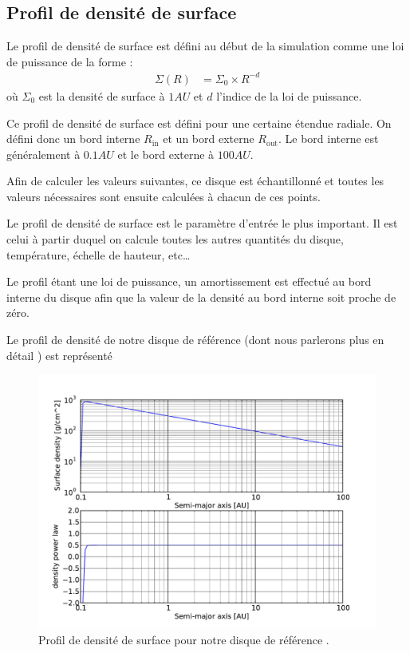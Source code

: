 \subsection{Profil de densité de surface}
Le profil de densité de surface est défini au début de la simulation comme une loi de puissance de la forme :
\begin{align}
\Sigma(R) &= \Sigma_0 \times R^{-d}
\end{align}
où $\Sigma_0$ est la densité de surface à $1\unit{AU}$ et $d$ l'indice de la loi de puissance. 

Ce profil de densité de surface est défini pour une certaine étendue radiale. On défini donc un bord interne $R_\text{in}$ et un bord externe $R_\text{out}$. Le bord interne est généralement à $0.1\unit{AU}$ et le bord externe à $100\unit{AU}$. 

Afin de calculer les valeurs suivantes, ce disque est échantillonné et toutes les valeurs nécessaires sont ensuite calculées à chacun de ces points. 

\bigskip

Le profil de densité de surface est le paramètre d'entrée le plus important. Il est celui à partir duquel on calcule toutes les autres quantités du disque, température, échelle de hauteur, etc\dots

Le profil étant une loi de puissance, un amortissement est effectué au bord interne du disque afin que la valeur de la densité au bord interne soit proche de zéro. 

Le profil de densité de notre disque de référence (dont nous parlerons plus en détail ) est représenté 

\begin{figure}[htb]
\centering
\includegraphics[width=0.75\linewidth]{figure/fiducial_density_profile.pdf}
\caption{Profil de densité de surface pour notre disque de référence \protect{}.}\label{fig:fiducial_density}
\end{figure}

